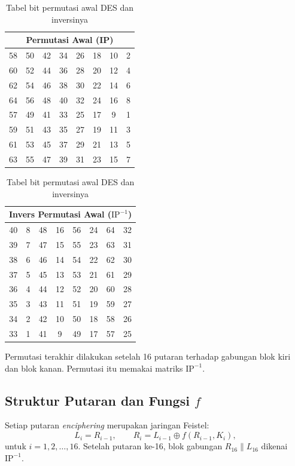 \begin{table}[htbp]
\centering
\small
\setlength{\tabcolsep}{4pt}
\begin{tabular}{@{}*{8}{c}@{}}
\multicolumn{8}{c}{\textbf{Permutasi Awal (IP)}} \\
\hline
58 & 50 & 42 & 34 & 26 & 18 & 10 & 2 \\
60 & 52 & 44 & 36 & 28 & 20 & 12 & 4 \\
62 & 54 & 46 & 38 & 30 & 22 & 14 & 6 \\
64 & 56 & 48 & 40 & 32 & 24 & 16 & 8 \\
57 & 49 & 41 & 33 & 25 & 17 & 9 & 1 \\
59 & 51 & 43 & 35 & 27 & 19 & 11 & 3 \\
61 & 53 & 45 & 37 & 29 & 21 & 13 & 5 \\
63 & 55 & 47 & 39 & 31 & 23 & 15 & 7 \\
\end{tabular}
\hspace{1.2em}
\begin{tabular}{@{}*{8}{c}@{}}
\multicolumn{8}{c}{\textbf{Invers Permutasi Awal ($\text{IP}^{-1}$)}} \\
\hline
40 & 8 & 48 & 16 & 56 & 24 & 64 & 32 \\
39 & 7 & 47 & 15 & 55 & 23 & 63 & 31 \\
38 & 6 & 46 & 14 & 54 & 22 & 62 & 30 \\
37 & 5 & 45 & 13 & 53 & 21 & 61 & 29 \\
36 & 4 & 44 & 12 & 52 & 20 & 60 & 28 \\
35 & 3 & 43 & 11 & 51 & 19 & 59 & 27 \\
34 & 2 & 42 & 10 & 50 & 18 & 58 & 26 \\
33 & 1 & 41 & 9 & 49 & 17 & 57 & 25 \\
\end{tabular}
\caption{Tabel bit permutasi awal DES dan inversinya}
\label{tab:ip-des}
\end{table}

Permutasi terakhir dilakukan setelah 16 putaran terhadap gabungan blok kiri
dan blok kanan. Permutasi itu memakai matriks $\text{IP}^{-1}$.

\subsection{Struktur Putaran dan Fungsi \texorpdfstring{$f$}{f}}

Setiap putaran \textit{enciphering} merupakan jaringan Feistel:
\begin{equation}
L_i = R_{i-1}, \qquad R_i = L_{i-1} \oplus f(R_{i-1}, K_i),
\label{eq:des-putaran}
\end{equation}
untuk $i = 1, 2, \dots, 16$. Setelah putaran ke-16, blok gabungan
$R_{16} \parallel L_{16}$ dikenai $\text{IP}^{-1}$.

